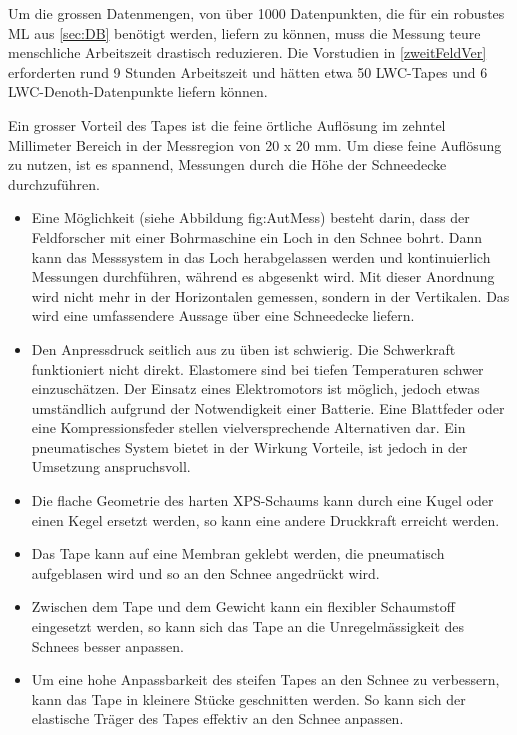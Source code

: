 Um die grossen Datenmengen, von über 1000 Datenpunkten, die für ein robustes ML aus \ref{sec:DB} benötigt werden, liefern zu können, muss die Messung teure menschliche Arbeitszeit drastisch reduzieren. Die Vorstudien in \ref{zweitFeldVer} erforderten rund 9 Stunden Arbeitszeit und hätten etwa 50 LWC-Tapes und 6 LWC-Denoth-Datenpunkte liefern können.

Ein grosser Vorteil des Tapes ist die feine örtliche Auflösung im zehntel Millimeter Bereich in der Messregion von 20 x 20 mm. Um diese feine Auflösung zu nutzen, ist es spannend, Messungen durch die Höhe der Schneedecke durchzuführen.

\begin{itemize}
\item Eine Möglichkeit (siehe Abbildung {fig:AutMess}) besteht darin, dass der Feldforscher mit einer Bohrmaschine ein Loch in den Schnee bohrt. Dann kann das Messsystem in das Loch herabgelassen werden und kontinuierlich Messungen durchführen, während es abgesenkt wird. Mit dieser Anordnung wird nicht mehr in der Horizontalen gemessen, sondern in der Vertikalen. Das wird eine umfassendere Aussage über eine Schneedecke liefern.

\item Den Anpressdruck seitlich aus zu üben ist schwierig. Die Schwerkraft funktioniert nicht direkt. Elastomere sind bei tiefen Temperaturen schwer einzuschätzen. Der Einsatz eines Elektromotors ist möglich, jedoch etwas umständlich aufgrund der Notwendigkeit einer Batterie. Eine Blattfeder oder eine Kompressionsfeder stellen vielversprechende Alternativen dar. Ein pneumatisches System bietet in der Wirkung Vorteile, ist jedoch in der Umsetzung anspruchsvoll.



\item Die flache Geometrie des harten XPS-Schaums kann durch eine Kugel oder einen Kegel ersetzt werden, so kann eine andere Druckkraft erreicht werden.


\item Das Tape kann auf eine Membran geklebt werden, die pneumatisch aufgeblasen wird und so an den Schnee angedrückt wird.

\item Zwischen dem Tape und dem Gewicht kann ein flexibler Schaumstoff eingesetzt werden, so kann sich das Tape an die Unregelmässigkeit des Schnees besser anpassen.

\item Um eine hohe Anpassbarkeit des steifen Tapes an den Schnee zu verbessern, kann das Tape in kleinere Stücke geschnitten werden. So kann sich der elastische Träger des Tapes effektiv an den Schnee anpassen.


\end{itemize}
